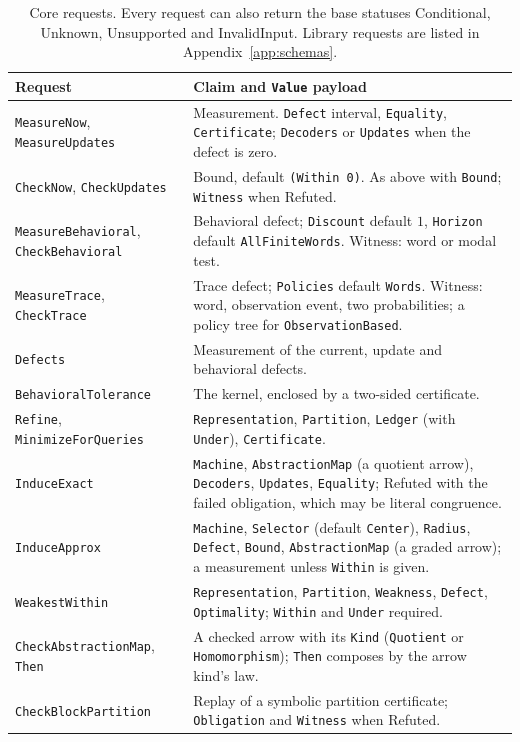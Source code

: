 \documentclass[11pt]{article}
\newcommand{\code}[1]{\texttt{#1}}
\theoremstyle{definition}
\theoremstyle{plain}
\begin{document}
\begin{table}[ht]
\centering\small
\begin{tabularx}{\textwidth}{>{\raggedright\arraybackslash}p{4.7cm}>{\raggedright\arraybackslash}X}
\toprule
Request & Claim and \code{Value} payload\\
\midrule
\code{MeasureNow}, \code{MeasureUpdates} & Measurement. \code{Defect} interval, \code{Equality}, \code{Certificate}; \code{Decoders} or \code{Updates} when the defect is zero.\\
\code{CheckNow}, \code{CheckUpdates} & Bound, default \code{(Within 0)}. As above with \code{Bound}; \code{Witness} when Refuted.\\
\code{MeasureBehavioral}, \code{CheckBehavioral} & Behavioral defect; \code{Discount} default $1$, \code{Horizon} default \code{AllFiniteWords}. Witness: word or modal test.\\
\code{MeasureTrace}, \code{CheckTrace} & Trace defect; \code{Policies} default \code{Words}. Witness: word, observation event, two probabilities; a policy tree for \code{ObservationBased}.\\
\code{Defects} & Measurement of the current, update and behavioral defects.\\
\code{BehavioralTolerance} & The kernel, enclosed by a two-sided certificate.\\
\code{Refine}, \code{MinimizeForQueries} & \code{Representation}, \code{Partition}, \code{Ledger} (with \code{Under}), \code{Certificate}.\\
\code{InduceExact} & \code{Machine}, \code{AbstractionMap} (a quotient arrow), \code{Decoders}, \code{Updates}, \code{Equality}; Refuted with the failed obligation, which may be literal congruence.\\
\code{InduceApprox} & \code{Machine}, \code{Selector} (default \code{Center}), \code{Radius}, \code{Defect}, \code{Bound}, \code{AbstractionMap} (a graded arrow); a measurement unless \code{Within} is given.\\
\code{WeakestWithin} & \code{Representation}, \code{Partition}, \code{Weakness}, \code{Defect}, \code{Optimality}; \code{Within} and \code{Under} required.\\
\code{CheckAbstractionMap}, \code{Then} & A checked arrow with its \code{Kind} (\code{Quotient} or \code{Homomorphism}); \code{Then} composes by the arrow kind's law.\\
\code{CheckBlockPartition} & Replay of a symbolic partition certificate; \code{Obligation} and \code{Witness} when Refuted.\\
\bottomrule
\end{tabularx}
\caption{Core requests. Every request can also return the base statuses Conditional, Unknown,
Unsupported and InvalidInput. Library requests are listed in Appendix~\ref{app:schemas}.}\label{tab:requests}
\end{table}
\end{document}
